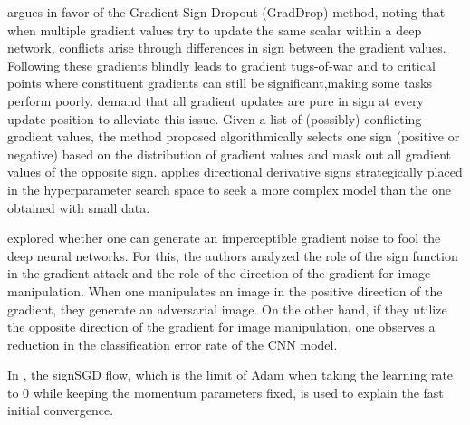 \documentclass[11pt]{book}
\begin{document}
\cite{chen2020just} argues in favor of the Gradient Sign Dropout
(GradDrop) method, noting that when multiple gradient values try to
update the same scalar within a deep network, conflicts arise through
differences in sign between the gradient values. Following these gradients
blindly leads to gradient tugs-of-war and to critical points where
constituent gradients can still be significant,making some tasks perform
poorly. \cite{chen2020just} demand that all gradient updates are
pure in sign at every update position to alleviate this issue. Given
a list of (possibly) conflicting gradient values, the method proposed
algorithmically selects one sign (positive or negative) based on the
distribution of gradient values and mask out all gradient values of
the opposite sign.\cite{joy2020fast} applies directional derivative
signs strategically placed in the hyperparameter search space to seek
a more complex model than the one obtained with small data.

\cite{agarwal2020role} explored whether one can generate an imperceptible
gradient noise to fool the deep neural networks. For this, the authors
analyzed the role of the sign function in the gradient attack and
the role of the direction of the gradient for image manipulation.
When one manipulates an image in the positive direction of the gradient,
they generate an adversarial image. On the other hand, if they utilize
the opposite direction of the gradient for image manipulation, one
observes a reduction in the classification error rate of the CNN model.

In \cite{ma2020qualitative}, the signSGD flow, which is the limit
of Adam when taking the learning rate to $0$ while keeping the momentum
parameters fixed, is used to explain the fast initial convergence.
\end{document}
